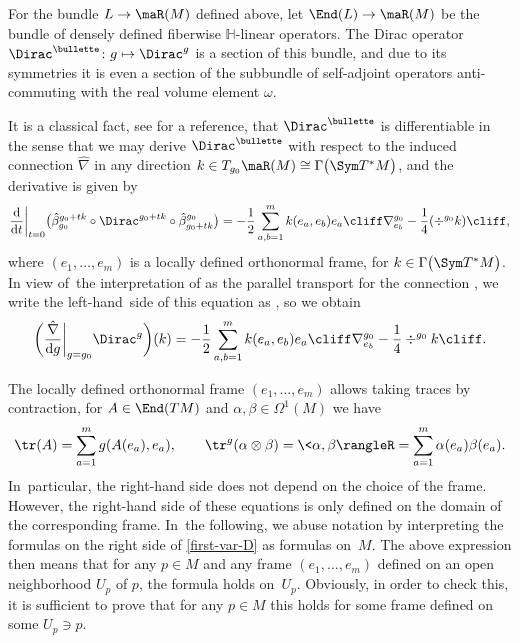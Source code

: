 For the bundle $L\to\maR(M)$ defined above, let $\End(L)\to \maR(M)$ be the bundle of densely defined fiberwise $\mathbb{H}$-linear operators.
The Dirac operator $\Dirac^{\bullette}\colon g \mapsto \Dirac^g$ is a section of this bundle, and due to its symmetries it is even a section of the subbundle  of self-adjoint operators anti-commuting with the real volume element $\omega$.

It is a classical fact, see \cite[Proposition~2.4]{maier:97} for a reference, that $\Dirac^{ \bullette}$ is differentiable in the sense that we may derive $\Dirac^{ \bullette}$ with respect to the induced connection $\hat\nabla$ in any direction $k\in T_{g_0}\maR(M)\cong\Gamma\bigl(\Sym T^*M\bigr)$, and the derivative is given by
\begin{equation*} %
 \frac{{\rm d}}{{\rm d}t}\bigg|_{t=0}\bigl(\hat\beta^{g_0+tk}_{g_0}\circ \Dirac^{g_0+tk}\circ\hat\beta_{g_0+tk}^{g_0}\bigr)=
-\frac{1}{2} \sum_{a,b=1}^m k(e_a,e_b) e_a \cliff \nabla^{g_0}_{e_b}
-\frac{1}{4} (\div^{g_0} k) \cliff ,
\end{equation*}
where $(e_1,\dots,e_m)$ is a locally defined orthonormal frame, for $k\in \Gamma\big(\Sym T^*M\big)$.
In view of~the interpretation of  as the parallel transport for the connection \smash{$\hat\nabla$}, we write the left-hand~side of this equation as
,
so we obtain
\begin{equation} \label{first-var-D}
\biggl(\frac{\hat\nabla}{{\rm d}g}\bigg|_{g=g_0} \Dirac^{g}\biggr) (k)
=
-\frac{1}{2} \sum_{a,b=1}^m k(e_a,e_b) e_a \cliff \nabla^{g_0}_{e_b}
-\frac{1}{4} \div^{g_0} k \cliff .
\end{equation}

The locally defined orthonormal frame $(e_1,\dots,e_m)$ allows taking traces by contraction, \eg for $A\in \End(TM)$ and $\alpha,\beta\in \Omega^1(M)$ we have
\[
\tr(A)=\sum_{a=1}^mg(A(e_a),e_a),\qquad \tr^g(\alpha\otimes \beta)=\<\alpha,\beta\rangleR=\sum_{a=1}^m\alpha(e_a)\beta(e_a) .
\]
In~particular, the right-hand side does not depend on the choice of the frame. However, the right-hand side of these equations is only defined on the domain of the corresponding frame. In~the following, we abuse notation by interpreting the formulas on the right side of \eqref{first-var-D} as formulas on~$M$.
The above expression then means that for any $p\in M$ and any frame $(e_1,\dots,e_m)$ defined on an open neighborhood $U_p$ of $p$, the formula holds on~$U_p$. Obviously, in order to check this, it is sufficient to prove that for any $p\in M$ this holds for some frame defined on some $U_p\ni p$.

